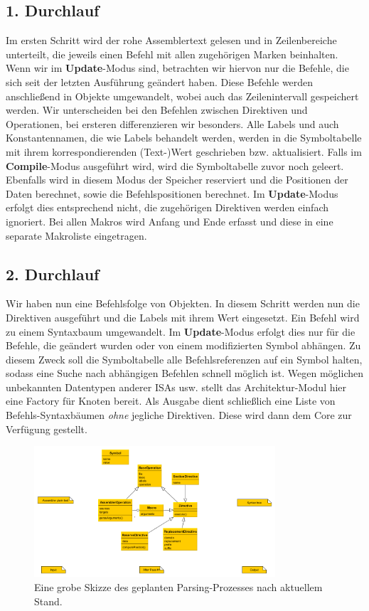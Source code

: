 \subsection{1. Durchlauf}

Im ersten Schritt wird der rohe Assemblertext gelesen und in Zeilenbereiche
unterteilt, die jeweils einen Befehl mit allen zugehörigen Marken beinhalten.
Wenn wir im \textbf{Update}-Modus sind, betrachten wir hiervon nur die Befehle,
die sich seit der letzten Ausführung geändert haben.  Diese Befehle werden
anschließend in Objekte umgewandelt, wobei auch das Zeilenintervall gespeichert
werden. Wir unterscheiden bei den Befehlen zwischen Direktiven und Operationen,
bei ersteren differenzieren wir besonders. Alle Labels und auch Konstantennamen,
die wie Labels behandelt werden, werden in die Symboltabelle mit ihrem
korrespondierenden (Text-)Wert geschrieben bzw. aktualisiert. Falls im
\textbf{Compile}-Modus ausgeführt wird, wird die Symboltabelle zuvor noch
geleert. Ebenfalls wird in diesem Modus der Speicher reserviert und die
Positionen der Daten berechnet, sowie die Befehlspositionen berechnet. Im
\textbf{Update}-Modus erfolgt dies entsprechend nicht, die zugehörigen
Direktiven werden einfach ignoriert.  Bei allen Makros wird Anfang und Ende
erfasst und diese in eine separate Makroliste eingetragen.

\subsection{2. Durchlauf}

Wir haben nun eine Befehlsfolge von Objekten. In diesem Schritt werden nun die
Direktiven ausgeführt und die Labels mit ihrem Wert eingesetzt. Ein Befehl wird
zu einem Syntaxbaum umgewandelt. Im \textbf{Update}-Modus erfolgt dies nur für die Befehle, die geändert wurden oder von einem modifizierten Symbol abhängen. Zu diesem Zweck soll die Symboltabelle alle Befehlsreferenzen auf ein Symbol halten, sodass eine Suche nach abhängigen Befehlen schnell möglich ist.
Wegen möglichen unbekannten Datentypen anderer ISAs usw. stellt das Architektur-Modul hier eine Factory für
Knoten bereit.  Als Ausgabe dient schließlich eine
Liste von Befehls-Syntaxbäumen \emph{ohne} jegliche Direktiven. Diese wird dann dem Core zur Verfügung gestellt.

\begin{figure}[h!]
  \centering
  \includegraphics[width=0.8\textwidth]{../parser/figures/process.png}
  \caption{Eine grobe Skizze des geplanten Parsing-Prozesses nach aktuellem Stand.}
\end{figure}

